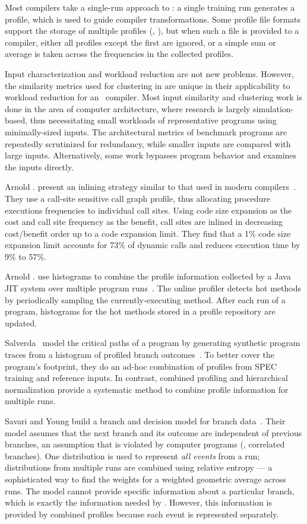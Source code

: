 Most compilers take a single-run approach to \FDO: a single training run
generates a profile, which is used to guide compiler transformations.
Some profile file formats support the storage of multiple profiles
(\eg, \llvm), but when such a file is provided to a compiler, either
all profiles except the first are ignored, or a simple sum or average
is taken across the frequencies in the collected profiles.

Input characterization and workload reduction are not new problems.
However, the similarity metrics used for clustering
in \cite{BerubePhD} are unique in their applicability to
workload reduction for an \FDO\ compiler.  Most input similarity and
clustering work is done in the area of computer architecture, where
research is largely simulation-based, thus necessitating small
workloads of representative programs using minimally-sized inputs. The
architectural metrics of benchmark programs are repeatedly scrutinized
for redundancy, while smaller inputs are compared with large
inputs. Alternatively, some work bypasses program behavior and
examines the inputs directly.

Arnold \etal. present an inlining strategy similar to that used in
modern compilers~\cite{Arnold00}. They use a call-site sensitive call
graph profile, thus allocating procedure executions frequencies to
individual call sites.  Using code size expansion as the cost and
call site frequency as the benefit, call sites are inlined in
decreasing cost/benefit order up to a code expansion limit.  They
find that a 1\% code size expansion limit accounts for 73\% of dynamic
calls and reduces execution time by 9\% to 57\%.

Arnold \etal. use histograms to combine the profile information
collected by a Java JIT system over multiple program
runs~\cite{ArnoldOOPSLA05}.  The online profiler detects hot methods
by periodically sampling the currently-executing method.  After each
run of a program, histograms for the hot methods stored in a profile
repository are updated.

Salverda \etal\ model the critical paths of a program by generating
synthetic program traces from a histogram of profiled branch
outcomes~\cite{SalverdaCGO08}. To better cover the program's
footprint, they do an ad-hoc combination of profiles from SPEC
training and reference inputs.  In contrast, combined profiling and
hierarchical normalization provide a systematic method to combine
profile information for multiple runs.

Savari and Young build a branch and decision model for branch
data~\cite{SavariYoungJIPL00}.  Their model assumes that the next
branch and its outcome are independent of previous branches, an
assumption that is violated by computer programs (\eg, correlated
branches).  One distribution is used to represent {\em all events}
from a run; distributions from multiple runs are combined using
relative entropy --- a sophisticated way to find the weights for a
weighted geometric average across runs.
The model cannot provide
specific information about a particular branch, which is exactly the
information needed by \FDO.  However, this information is provided by
combined profiles because each event is represented separately.
